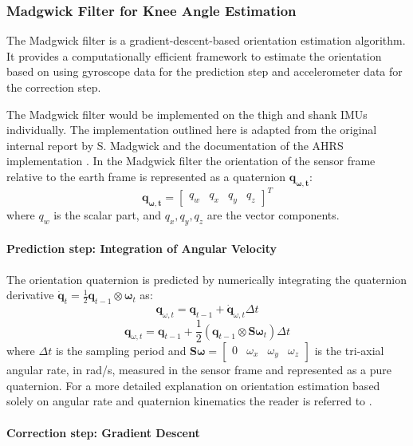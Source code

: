 \subsubsection{Madgwick Filter for Knee Angle Estimation}
The Madgwick filter is a gradient-descent-based orientation estimation algorithm. It provides a computationally efficient framework to estimate the orientation based on using gyroscope data for the prediction step and accelerometer data for the correction step. 

The Madgwick filter would be implemented on the thigh and shank IMUs individually. The implementation outlined here is adapted from the original internal report by S. Madgwick  \cite{madgwick_ecient_nodate} and the documentation of the AHRS implementation \cite{noauthor_madgwick_nodate}. In the Madgwick filter the orientation of the sensor frame relative to the earth frame is represented as a quaternion \( \mathbf{q_{\omega , t}} \):
\[
\mathbf{q_{\omega , t}} = 
\begin{bmatrix}
q_w & q_x & q_y & q_z
\end{bmatrix}^T
\]
where \( q_w \) is the scalar part, and \( q_x, q_y, q_z \) are the vector components.
\newline

\paragraph*{Prediction step: Integration of Angular Velocity}

The orientation quaternion is predicted by numerically integrating the quaternion derivative 
\(
\dot{\mathbf{q}}_t = \frac{1}{2} \mathbf{q}_{t-1} \otimes \boldsymbol{\omega}_t
\) as:
\[
\mathbf{q}_{\omega, t} = \mathbf{q}_{t-1} + \dot{\mathbf{q}}_{\omega, t} \Delta t
\]
\[
\mathbf{q}_{\omega, t} = \mathbf{q}_{t-1} + \frac{1}{2} \left( \mathbf{q}_{t-1} \otimes \mathbf{S}\boldsymbol{\omega}_t \right) \Delta t
\]
where \( \Delta t \) is the sampling period and 
\(
\mathbf{S}\boldsymbol{\omega} = 
\begin{bmatrix}
0 & \omega_x & \omega_y & \omega_z
\end{bmatrix}
\)
is the tri-axial angular rate, in rad/s, measured in the sensor frame and represented as a pure quaternion. For a more detailed explanation on orientation estimation based solely on angular rate and quaternion kinematics the reader is referred to \cite{sola_quaternion_2017}.
\newline

\paragraph*{Correction step: Gradient Descent}

